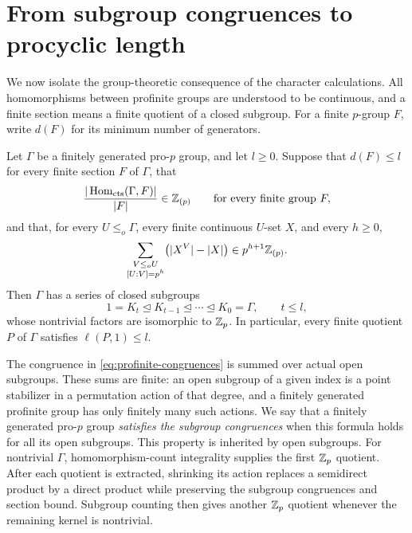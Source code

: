 \section{From subgroup congruences to procyclic length}\label{sec:profinite}

We now isolate the group-theoretic consequence of the character calculations.
All homomorphisms between profinite groups are understood to be continuous, and a finite
section means a finite quotient of a closed subgroup.  For a finite
$p$-group $F$, write $d(F)$ for its minimum number of generators.

\begin{theorem}\label{thm:procyclic}
Let $\Gamma$ be a finitely generated pro-$p$ group, and let $l\geq0$.
Suppose that $d(F)\leq l$ for every finite section $F$ of $\Gamma$, that
\begin{equation}\label{eq:profinite-hom}
 \frac{|\operatorname{Hom}_{\mathrm{cts}}(\Gamma,F)|}{|F|}\in\mathbb Z_{(p)}
 \qquad\text{for every finite group }F,
\end{equation}
and that, for every $U\leq_o\Gamma$, every finite continuous $U$-set $X$,
and every $h\geq0$,
\begin{equation}\label{eq:profinite-congruences}
 \sum_{\substack{V\leq_o U\\{}[U:V]=p^h}}
       \bigl(|X^V|-|X|\bigr)
       \in p^{h+1}\mathbb Z_{(p)}.
\end{equation}
Then $\Gamma$ has a series of closed subgroups
\[
 1=K_t\trianglelefteq K_{t-1}\trianglelefteq\cdots
   \trianglelefteq K_0=\Gamma,
 \qquad t\leq l,
\]
whose nontrivial factors are isomorphic to $\mathbb Z_p$.
In particular, every finite quotient $P$ of $\Gamma$ satisfies
$\ell(P,1)\leq l$.
\end{theorem}

The congruence in \eqref{eq:profinite-congruences} is summed over actual
open subgroups.  These sums are finite: an open subgroup of a given
index is a point stabilizer in a permutation action of that degree,
and a finitely generated profinite group has only finitely many such
actions.  We say that a finitely generated pro-$p$ group
\emph{satisfies the subgroup congruences} when this formula holds
for all its open subgroups.  This property is inherited by open
subgroups. For nontrivial $\Gamma$, homomorphism-count integrality
supplies the first $\mathbb Z_p$ quotient. After each quotient is extracted,
shrinking its action replaces a semidirect product by a direct product
while preserving the subgroup congruences and section bound.
Subgroup counting then gives another $\mathbb Z_p$ quotient whenever the
remaining kernel is nontrivial.

